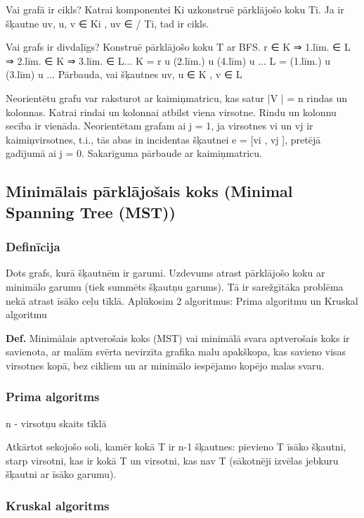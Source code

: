 \documentclass{article}
\begin{document}
Vai grafā ir cikls?  Katrai komponentei Ki uzkonstruē pārklājošo koku Ti. Ja ir šķautne uv, u, v ∈ Ki , uv ∈ / Ti, tad ir cikls.

Vai grafs ir divdaļīgs?  Konstruē pārklājošo koku T ar BFS.
r ∈ K ⇒ 1.līm. ∈ L ⇒ 2.līm. ∈ K ⇒ 3.līm. ∈ L...
K = r u (2.līm.) u (4.līm) u ...
L = (1.līm.) u (3.līm) u ...
Pārbauda, vai šķautnes uv, u ∈ K , v ∈ L

Neorientētu grafu var raksturot ar kaimiņmatricu, kas satur |V | = n rindas un kolonnas.  Katrai rindai un kolonnai atbilst viena virsotne.  Rindu un kolonnu secība ir vienāda.  Neorientētam grafam ai j = 1, ja virsotnes vi un vj ir kaimiņvirsotnes, t.i., tās abas in incidentas šķautnei e = [vi , vj ], pretējā gadījumā ai j = 0.  Sakarīguma pārbaude ar kaimiņmatricu.

\subsection{Minimālais pārklājošais koks (Minimal Spanning Tree (MST))}

\subsubsection{Definīcija}

Dots grafs, kurā šķautnēm ir garumi. Uzdevums atrast pārklājošo koku ar minimālo garumu (tiek summēts šķautņu garums).  Tā ir sarežgītāka problēma nekā atrast īsāko ceļu tīklā. Aplūkosim 2 algoritmus: Prima algoritmu un Kruskal algoritmu

\textbf{Def.} Minimālais aptverošais koks (MST) vai minimālā svara aptverošais koks ir savienota, ar malām svērta nevirzīta grafika malu apakškopa, kas savieno visas virsotnes kopā, bez cikliem un ar minimālo iespējamo kopējo malas svaru.

\subsubsection{Prima algoritms}
n - virsotņu skaits tīklā

Atkārtot sekojošo soli, kamēr kokā T ir n-1 šķautnes: pievieno T īsāko šķautni, starp virsotni, kas ir kokā T un virsotni, kas nav T (sākotnēji izvēlas jebkuru šķautni ar īsāko garumu).

\subsubsection{Kruskal algoritms}
\end{document}
